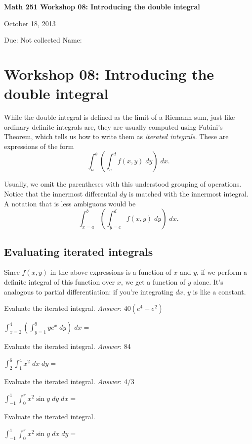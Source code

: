 \documentclass[12pt]{exam}
\theoremstyle{definition}
\begin{document}
\noindent
\textbf{{\large Math 251 \hfill Workshop 08: Introducing the double integral}}

\noindent
October 18, 2013 

\noindent
Due: Not collected \hfill Name: \underline{\hspace{3in}} 

\noindent

\section{Workshop 08: Introducing the double integral}

While the double integral is defined as the limit of a Riemann sum, just
like ordinary definite integrals are, they are usually computed using
Fubini's Theorem, which tells us how to write them as
\emph{iterated integrals}. These are expressions of the form
\[ \int_a^b \left( \int_c^d f(x,y) \; dy \right) \; dx. \]

Usually, we omit the parentheses with this understood grouping of
operations. Notice that the innermost differential $dy$ is matched with
the innermost integral. A notation that is less ambiguous would be
\[ \int_{x=a}^b \left( \int_{y=c}^d f(x,y) \; dy \right) \; dx. \]

\subsection{Evaluating iterated integrals}

Since $f(x,y)$ in the above expressions is a function of $x$ and $y$, if
we perform a definite integral of this function over $x$, we get a
function of $y$ alone. It's analogous to partial differentiation: if
you're integrating $dx$, $y$ is like a constant.

\begin{questions}

\question Evaluate the iterated integral. \emph{Answer}: $40(e^4 - e^2)$

$\displaystyle\int_{x=2}^4 \left( \displaystyle\int_{y=1}^9 ye^x \; dy \right) \; dx = $


\newpage

\question Evaluate the iterated integral. \emph{Answer}: 84

$\displaystyle\int_{2}^{6} \displaystyle\int_{1}^{4} x^2 \; dx \; dy = $




\question Evaluate the iterated integral. \emph{Answer}: 4/3

$\displaystyle\int_{-1}^{1} \displaystyle\int_0^{\pi} x^2 \sin{y} \; dy \; dx = $


\question Evaluate the iterated integral. 

$\displaystyle\int_{-1}^{1} \displaystyle\int_0^{\pi} x^2 \sin{y} \; dx \; dy = $


\end{questions} 
\end{document}
